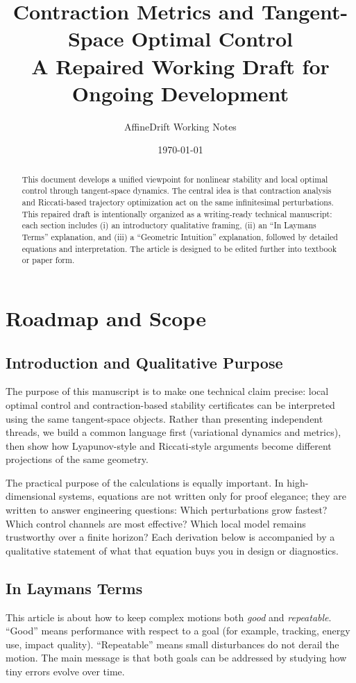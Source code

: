 \documentclass[11pt,letterpaper]{article}
\title{Contraction Metrics and Tangent-Space Optimal Control\\\large A Repaired Working Draft for Ongoing Development}
\author{AffineDrift Working Notes}
\date{\today}
\begin{document}
\maketitle

\begin{abstract}
This document develops a unified viewpoint for nonlinear stability and local optimal control through tangent-space dynamics. The central idea is that contraction analysis and Riccati-based trajectory optimization act on the same infinitesimal perturbations. This repaired draft is intentionally organized as a writing-ready technical manuscript: each section includes (i) an introductory qualitative framing, (ii) an ``In Laymans Terms'' explanation, and (iii) a ``Geometric Intuition'' explanation, followed by detailed equations and interpretation. The article is designed to be edited further into textbook or paper form.
\end{abstract}

\tableofcontents
\newpage

\section{Roadmap and Scope}

\subsection{Introduction and Qualitative Purpose}
The purpose of this manuscript is to make one technical claim precise: local optimal control and contraction-based stability certificates can be interpreted using the same tangent-space objects. Rather than presenting independent threads, we build a common language first (variational dynamics and metrics), then show how Lyapunov-style and Riccati-style arguments become different projections of the same geometry.

The practical purpose of the calculations is equally important. In high-dimensional systems, equations are not written only for proof elegance; they are written to answer engineering questions: Which perturbations grow fastest? Which control channels are most effective? Which local model remains trustworthy over a finite horizon? Each derivation below is accompanied by a qualitative statement of what that equation buys you in design or diagnostics.

\subsection{In Laymans Terms}
This article is about how to keep complex motions both \emph{good} and \emph{repeatable}. ``Good'' means performance with respect to a goal (for example, tracking, energy use, impact quality). ``Repeatable'' means small disturbances do not derail the motion. The main message is that both goals can be addressed by studying how tiny errors evolve over time.
\end{document}

